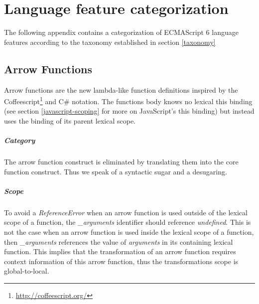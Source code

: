 
\chapter{Language feature categorization} %

\label{AppendixB} %


The following appendix contains a categorization of ECMAScript 6 language features according to the taxonomy established in section \ref{taxonomy}

\section{Arrow Functions} \label{arrow}
Arrow functions\cite[14.2]{SpecJS} are the new lambda-like function definitions inspired by the Coffeescript\footnote{\url{http://coffeescript.org/}} and C\# notation. The functions body knows no lexical this binding (see section \ref{javascript-scoping} for more on JavaScript's this binding) but instead uses the binding of its parent lexical scope.

\paragraph{Category}
The arrow function construct is eliminated by translating them into the core function construct. Thus we speak of a syntactic sugar and a desugaring.

\paragraph{Scope}
To avoid a \textit{ReferenceError} when an arrow function is used outside of the lexical scope of a function, the \textit{\_arguments} identifier should reference \textit{undefined}. This is not the case when an arrow function is used inside the lexical scope of a function, then \textit{\_arguments} references the value of \textit{arguments} in its containing lexical function. This implies that the transformation of an arrow function requires context information of this arrow function, thus the transformations scope is global-to-local.

